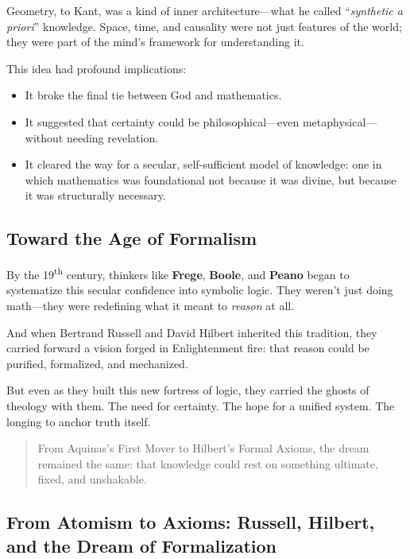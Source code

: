 Geometry, to Kant, was a kind of inner architecture—what he called “\textit{synthetic a priori}” knowledge. Space, time, and causality were not just features of the world; they were part of the mind’s framework for understanding it.

\medskip

This idea had profound implications:

\begin{itemize}
    \item It broke the final tie between God and mathematics.
    \item It suggested that certainty could be philosophical—even metaphysical—without needing revelation.
    \item It cleared the way for a secular, self-sufficient model of knowledge: one in which mathematics was foundational not because it was divine, but because it was structurally necessary.
\end{itemize}

\subsection{Toward the Age of Formalism}

By the 19\textsuperscript{th} century, thinkers like \textbf{Frege}, \textbf{Boole}, and \textbf{Peano} began to systematize this secular confidence into symbolic logic. They weren't just doing math—they were redefining what it meant to \textit{reason} at all.

And when Bertrand Russell and David Hilbert inherited this tradition, they carried forward a vision forged in Enlightenment fire: that reason could be purified, formalized, and mechanized.

But even as they built this new fortress of logic, they carried the ghosts of theology with them. The need for certainty. The hope for a unified system. The longing to anchor truth itself.

\begin{quote}
    From Aquinas’s First Mover to Hilbert’s Formal Axioms, the dream remained the same: that knowledge could rest on something ultimate, fixed, and unshakable.
\end{quote}

\subsection{From Atomism to Axioms: Russell, Hilbert, and the Dream of Formalization}

